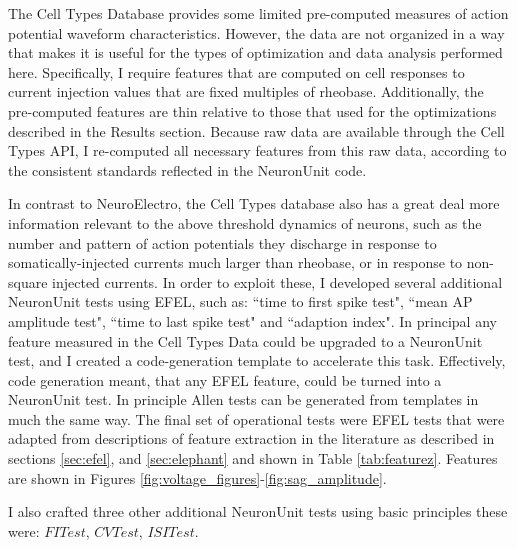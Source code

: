 The Cell Types Database provides some limited pre-computed measures of action potential waveform characteristics. 
However, the data are not organized in a way that makes it is useful for the types of optimization and data analysis performed here.
Specifically, I require features that are computed on cell responses to current injection values that are fixed multiples of rheobase.
Additionally, the pre-computed features are thin relative to those that used for the optimizations described in the Results section.
Because raw data are available through the Cell Types API, I re-computed all necessary features from this raw data, according to the consistent standards reflected in the NeuronUnit code.

In contrast to NeuroElectro, the Cell Types database also has a great deal more information relevant to the above threshold dynamics of neurons, such as the number and pattern of action potentials they discharge in response to somatically-injected currents much larger than rheobase, or in response to non-square injected currents.
In order to exploit these, I developed several additional NeuronUnit tests using EFEL, such as: ``time to first spike test", ``mean AP amplitude test", ``time to last spike test" and ``adaption index". In principal any feature measured in the Cell Types Data could be upgraded to a NeuronUnit test, and I created a code-generation template to accelerate this task. Effectively, code generation meant, that any EFEL feature, could be turned into a NeuronUnit test. In principle Allen tests can be generated from templates in much the same way. The final set of operational tests
were EFEL tests that were adapted from descriptions of feature extraction in the literature as described in sections \ref{sec:efel}, and \ref{sec:elephant} and shown in Table \ref{tab:featurez}. Features are shown in Figures \ref{fig:voltage_figures}-\ref{fig:sag_amplitude}.

I also crafted three other additional NeuronUnit tests using basic principles these were: $FITest$, $CVTest$, $ISITest$. 



